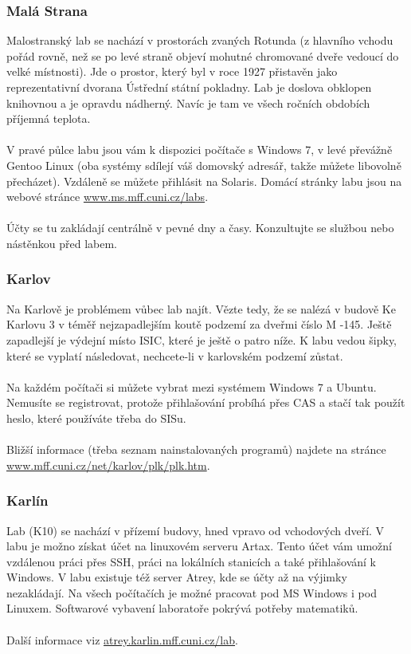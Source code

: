 \subsubsection{Malá Strana}
Malostranský lab se nachází v prostorách zvaných Rotunda (z hlavního vchodu
pořád rovně, než se po levé straně objeví mohutné chromované dveře vedoucí do
velké místnosti). Jde o prostor, který byl v roce 1927 přistavěn jako
reprezentativní dvorana Ústřední státní pokladny. Lab je doslova obklopen
knihovnou a je opravdu nádherný. Navíc je tam ve všech ročních obdobích příjemná
teplota.
\\\\
V pravé půlce labu jsou vám k dispozici počítače s Windows 7, v levé převážně
Gentoo Linux (oba systémy sdílejí váš domovský adresář, takže můžete libovolně
přecházet). Vzdáleně se můžete přihlásit na Solaris. Domácí stránky labu jsou na
webové stránce \url{www.ms.mff.cuni.cz/labs}.
\\\\
Účty se tu zakládají centrálně v pevné dny a časy. Konzultujte se službou nebo
nástěnkou před labem.


\subsubsection{Karlov}
Na Karlově je problémem vůbec lab najít. Vězte tedy, že se nalézá v budově Ke
Karlovu 3 v téměř nejzapadlejším koutě podzemí za dveřmi číslo M -145. Ještě
zapadlejší je výdejní místo ISIC, které je ještě o patro níže. K labu vedou
šipky, které se vyplatí následovat, nechcete-li v karlovském podzemí zůstat.
\\\\
Na každém počítači si můžete vybrat mezi systémem Windows 7 a Ubuntu. Nemusíte
se registrovat, protože přihlašování probíhá přes CAS a stačí tak použít heslo,
které používáte třeba do SISu.
\\\\
Bližší informace (třeba seznam nainstalovaných programů) najdete na stránce
\url{www.mff.cuni.cz/net/karlov/plk/plk.htm}.


\subsubsection{Karlín}
Lab (K10) se nachází v přízemí budovy, hned vpravo od vchodových dveří. V labu
je možno získat účet na linuxovém serveru Artax. Tento účet vám umožní vzdálenou
práci přes SSH, práci na lokálních stanicích a také přihlašování k Windows. V
labu existuje též server Atrey, kde se účty až na výjimky nezakládají. Na všech
počítačích je možné pracovat pod MS Windows i pod Linuxem. Softwarové vybavení
laboratoře pokrývá potřeby matematiků.
\\\\
Další informace viz \url{atrey.karlin.mff.cuni.cz/lab}.


